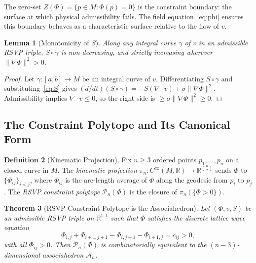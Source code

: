 \documentclass[12pt, oneside]{amsart}
\theoremstyle{plain}
\newtheorem{theorem}{Theorem}[section]
\newtheorem{lemma}[theorem]{Lemma}
\theoremstyle{definition}
\newtheorem{definition}[theorem]{Definition}
\theoremstyle{remark}
\newcommand{\R}{\mathbb{R}}
\newcommand{\Phif}{\Phi}
\newcommand{\vf}{v}
\newcommand{\Sf}{S}
\newcommand{\Assoc}{\mathcal{A}_n}
\begin{document}
The zero-set $Z(\Phif) = \{p \in M : \Phif(p) = 0\}$ is the constraint boundary: the surface at which physical admissibility fails. The field equation~\eqref{eq:phi} ensures this boundary behaves as a characteristic surface relative to the flow of $\vf$.

\begin{lemma}[Monotonicity of $\Sf$]
\label{lem:S-monotone}
Along any integral curve $\gamma$ of $\vf$ in an admissible RSVP triple, $\Sf \circ \gamma$ is non-decreasing, and strictly increasing wherever $\|\nabla\Phif\|^2 > 0$.
\end{lemma}

\begin{proof}
Let $\gamma: [a,b] \to M$ be an integral curve of $\vf$. Differentiating $\Sf \circ \gamma$ and substituting~\eqref{eq:S} gives $(d/dt)(\Sf \circ \gamma) = -\Sf(\nabla \cdot \vf) + \sigma\|\nabla\Phif\|^2$. Admissibility implies $\nabla \cdot \vf \leq 0$, so the right side is $\geq \sigma\|\nabla\Phif\|^2 \geq 0$.
\end{proof}

\subsection{The Constraint Polytope and Its Canonical Form}

\begin{definition}[Kinematic Projection]
Fix $n \geq 3$ ordered points $p_1, \ldots, p_n$ on a closed curve in $M$. The \emph{kinematic projection} $\pi_n: C^\infty(M,\R) \to \R^{\binom{n}{2}}$ sends $\Phif$ to $\{\Phif_{ij}\}_{i < j}$, where $\Phif_{ij}$ is the arc-length average of $\Phif$ along the geodesic from $p_i$ to $p_j$. The \emph{RSVP constraint polytope} $\mathcal{P}_n(\Phif)$ is the closure of $\pi_n(\{\Phif > 0\})$.
\end{definition}

\begin{theorem}[RSVP Constraint Polytope is the Associahedron]
\label{thm:assoc}
Let $(\Phif, \vf, \Sf)$ be an admissible RSVP triple on $\R^{1,1}$ such that $\Phif$ satisfies the discrete lattice wave equation
\begin{equation}
\label{eq:lattice-wave}
  \Phif_{i,j} + \Phif_{i+1,j+1} - \Phif_{i,j+1} - \Phif_{i+1,j} = c_{ij} > 0,
\end{equation}
with all $\Phif_{ij} > 0$. Then $\mathcal{P}_n(\Phif)$ is combinatorially equivalent to the $(n-3)$-dimensional associahedron $\Assoc$.
\end{theorem}
\end{document}
